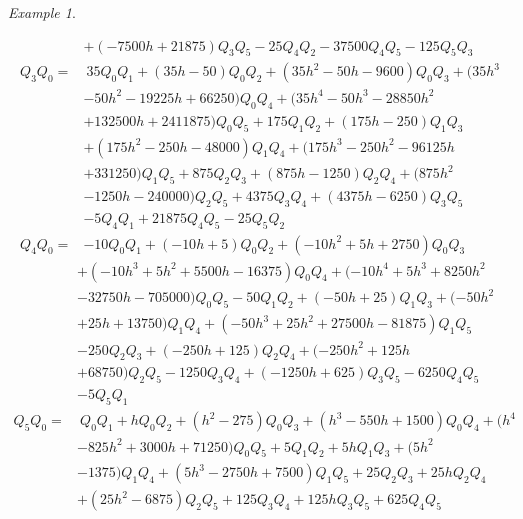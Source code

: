 \documentclass{gtpart}
\theoremstyle{definition}
\theoremstyle{remark}
\newtheorem{ex}[thm]{Example}
\renewcommand{\=}{\approx}
\renewcommand{\-}{\sim}
\numberwithin{equation}{section}
\numberwithin{thm}{section}
\begin{document}
\begin{ex}
\begin{itemize}
\begin{equation*}
\begin{split}
              & + (-7500 h + 21875) Q_3 Q_5 - 25 Q_4 Q_2 - 37500 Q_4 Q_5 - 125 Q_5 Q_3 \\
    Q_3 Q_0 = & ~ 35 Q_0 Q_1 + (35 h - 50) Q_0 Q_2 + (35 h^2 - 50 h - 9600) Q_0 Q_3 + (35 h^3 \\
              & - 50 h^2 - 19225 h + 66250) Q_0 Q_4 + (35 h^4 - 50 h^3 - 28850 h^2 \\
              & + 132500 h + 2411875) Q_0 Q_5 + 175 Q_1 Q_2 + (175 h - 250) Q_1 Q_3 \\
              & + (175 h^2 - 250 h - 48000) Q_1 Q_4 + (175 h^3 - 250 h^2 - 96125 h \\
              & + 331250) Q_1 Q_5 + 875 Q_2 Q_3 + (875 h - 1250) Q_2 Q_4 + (875 h^2 \\
              & - 1250 h - 240000) Q_2 Q_5 + 4375 Q_3 Q_4 + (4375 h - 6250) Q_3 Q_5 \\
              & - 5 Q_4 Q_1 + 21875 Q_4 Q_5 - 25 Q_5 Q_2 \\
    Q_4 Q_0 = & -10 Q_0 Q_1 + (-10 h + 5) Q_0 Q_2 + (-10 h^2 + 5 h + 2750) Q_0 Q_3 
   \end{split}
  \end{equation*}
  \begin{equation*}
   \begin{split}
              & + (-10 h^3 + 5 h^2 + 5500 h - 16375) Q_0 Q_4 + (-10 h^4 + 5 h^3 + 8250 h^2 \\
              & - 32750 h - 705000) Q_0 Q_5 - 50 Q_1 Q_2 + (-50 h + 25) Q_1 Q_3 + (-50 h^2 \\
              & + 25 h + 13750) Q_1 Q_4 + (-50 h^3 + 25 h^2 + 27500 h - 81875) Q_1 Q_5 \\
              & - 250 Q_2 Q_3 + (-250 h + 125) Q_2 Q_4 + (-250 h^2 + 125 h \\
              & + 68750) Q_2 Q_5 - 1250 Q_3 Q_4 + (-1250 h + 625) Q_3 Q_5 - 6250 Q_4 Q_5 \\
              & - 5 Q_5 Q_1 \\
    Q_5 Q_0 = & ~ Q_0 Q_1 + h Q_0 Q_2 + (h^2 - 275) Q_0 Q_3 + (h^3 - 550 h + 1500) Q_0 Q_4 + (h^4 \\
              & - 825 h^2 + 3000 h + 71250) Q_0 Q_5 + 5 Q_1 Q_2 + 5 h Q_1 Q_3 + (5 h^2 \\
              & - 1375) Q_1 Q_4 + (5 h^3 - 2750 h + 7500) Q_1 Q_5 + 25 Q_2 Q_3 + 25 h Q_2 Q_4\\
              & + (25 h^2 - 6875) Q_2 Q_5 + 125 Q_3 Q_4 + 125 h Q_3 Q_5 + 625 Q_4 Q_5 
   \end{split}
  \end{equation*}


\end{itemize}
\end{ex}
\end{document}

